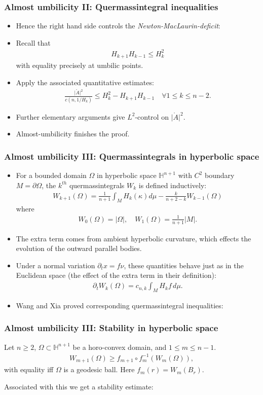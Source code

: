 \documentclass{beamer}
\newcommand{\mr}{\mathring}
\newcommand{\8}{\infty}
\newcommand{\Om}{\Omega}
\newcommand{\del}{\partial}
\newcommand{\fa}{\forall}
\newcommand{\fr}[2]{\frac{#1}{#2}}
\newcommand{\eq}[1]{\begin{equation}\begin{alignedat}{2} #1 \end{alignedat}\end{equation}}
\newcommand{\abs}[1]{\lvert #1\rvert}
\newcommand{\q}{\quad}
\begin{document}
\begin{frame} 
\frametitle{Almost umbilicity II: Quermassintegral inequalities}
\begin{itemize}
	\item[] Hence the right hand side controls the {\it{Newton-MacLaurin-deficit}}:
	\item[] Recall that
	\eq{H_{k+1}H_{k-1}\leq H_{k}^{2}}
	with equality precisely at umbilic points.
	\item[]
Apply the associated quantitative estimates:
\eq{\fr{\abs{\mr{A}}^{2}}{c(n,1/H_{k})}\leq H_{k}^{2}-H_{k+1}H_{k-1}\q\fa 1\leq k\leq n-2.}
	\item[] Further elementary arguments give $L^{2}$-control on $\abs{\mr{A}}^{2}$.
	\item[] Almost-umbilicity finishes the proof.
\end{itemize}
\end{frame}



\begin{frame} 
\frametitle{Almost umbilicity III: Quermassintegrals in hyperbolic space }
\begin{itemize}
	\item[] For a bounded domain $\Omega$ in hyperbolic space $\mathbb{H}^{n+1}$ with $C^{2}$ boundary $M= \partial \Omega$, the $k^{th}$ quermassintegrals $W_{k}$ is defined inductively:
\eq{
W_{k+1}(\Omega)= \frac{1}{n+1}\int_{M}H_{k}(\kappa)d\mu - \frac{k}{n+2-k}W_{k-1}(\Omega)}
where
\eq{W_{0}(\Omega) = \abs{\Om},\q
W_{1}(\Omega)= \frac{1}{n+1}\lvert M\rvert.
}
	\item[] The extra term comes from ambient hyperbolic curvature, which effects the evolution of the outward parallel bodies.
	\item[]Under a normal variation $\del_{t}x = f\nu$, these quantities behave just as in the Euclidean space (the effect of the extra term in their definition):
	\eq{\del_{t}W_{k}(\Om) = c_{n,k}\int_{M}H_{k}f\,d\mu.}
	\item[] Wang and Xia proved corresponding quermassintegral inequalities:
	 \end{itemize}
\end{frame}




\begin{frame} 
\frametitle{Almost umbilicity III: Stability in hyperbolic space }
\begin{theorem}
Let $n\geq 2$, $\Omega \subset \mathbb{H}^{n+1}$ be a horo-convex domain, and $1\leq m\leq n-1$.
\eq{W_{m+1}(\Om)\geq f_{m+1}\circ f_{m}^{-1}(W_{m}(\Om)),}
with equality iff $\Om$ is a geodesic ball. Here $f_{m}(r)=W_{m}(B_{r})$.
\end{theorem}  
Associated with this we get a stability estimate:
\end{frame}
\end{document}
